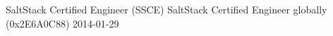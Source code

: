 \certificationitem
{SaltStack Certified Engineer (SSCE)}
{\companysaltstack}
{ SaltStack Certified Engineer globally (0x2E6A0C88)}%
{2014-01-29}